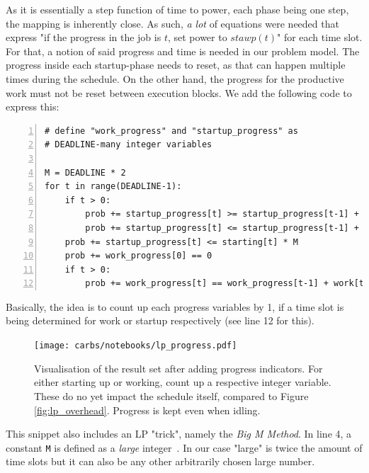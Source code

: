 As it is essentially a step function of time to power, each phase being one step, the mapping is inherently close. 
As such, \emph{a lot} of equations were needed that express "if the progress in the job is $t$, set power to $stawp(t)$" for each time slot. 
For that, a notion of said progress and time is needed in our problem model.
The progress inside each startup-phase needs to reset, as that can happen multiple times during the schedule. 
On the other hand, the progress for the productive work must not be reset between execution blocks. 
We add the following code to express this:

\begin{minipage}{\linewidth}
\begin{lstlisting}[frame=single, numbers=left, caption={Progress Variables in LP}, label={list:lp_progress}, basicstyle=\ttfamily, breaklines]
# define "work_progress" and "startup_progress" as 
# DEADLINE-many integer variables

M = DEADLINE * 2
for t in range(DEADLINE-1):
    if t > 0:
        prob += startup_progress[t] >= startup_progress[t-1] + 1 - (1 - starting[t]) * M 
        prob += startup_progress[t] <= startup_progress[t-1] + 1 + (1 - starting[t]) * M
    prob += startup_progress[t] <= starting[t] * M 
    prob += work_progress[0] == 0
    if t > 0:
        prob += work_progress[t] == work_progress[t-1] + work[t]
\end{lstlisting}
\end{minipage}

Basically, the idea is to count up each progress variables by 1, if a time slot is being determined for work or startup respectively (see line 12 for this).

\begin{figure}[H]
    \texttt{[image: carbs/notebooks/lp\_progress.pdf]}
    \caption{Visualisation of the result set after adding progress indicators. For either starting up or working, count up a respective integer variable. These do no yet impact the schedule itself, compared to Figure \ref{fig:lp_overhead}. Progress is kept even when idling.}
    \label{fig:lp_progress}
\end{figure}

This snippet also includes an LP "trick", namely the \emph{Big M Method}. 
In line 4, a constant \verb|M| is defined as a \emph{large} integer~.
In our case "large" is twice the amount of time slots but it can also be any other arbitrarily chosen large number.

